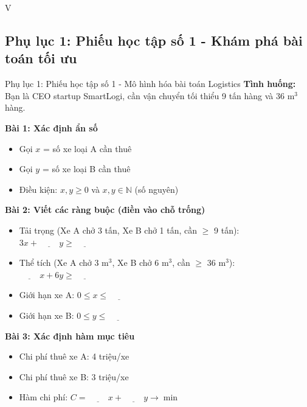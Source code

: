
\begin{competitionsection}{V}
\vspace{0.5cm}
\subsection*{Phụ lục 1: Phiếu học tập số 1 - Khám phá bài toán tối ưu}
\begin{phieuhoc_tap_box}{Phụ lục 1: Phiếu học tập số 1 - Mô hình hóa bài toán Logistics}
\textbf{Tình huống:} Bạn là CEO startup SmartLogi, cần vận chuyển tối thiểu 9 tấn hàng và 36 m$^3$ hàng.

\vspace{0.5cm}
\textbf{Bài 1: Xác định ẩn số}
\begin{itemize}[leftmargin=*,noitemsep]
\item Gọi $x$ = số xe loại A cần thuê
\item Gọi $y$ = số xe loại B cần thuê
\item Điều kiện: $x, y \ge 0$ và $x, y \in \mathbb{N}$ (số nguyên)
\end{itemize}

\textbf{Bài 2: Viết các ràng buộc (điền vào chỗ trống)}
\begin{itemize}[leftmargin=*,noitemsep]
\item Tải trọng (Xe A chở 3 tấn, Xe B chở 1 tấn, cần $\ge$ 9 tấn): $3x + \underline{\hspace{1cm}}y \ge \underline{\hspace{1cm}}$
\item Thể tích (Xe A chở 3 m$^3$, Xe B chở 6 m$^3$, cần $\ge$ 36 m$^3$): $\underline{\hspace{1cm}}x + 6y \ge \underline{\hspace{1cm}}$
\item Giới hạn xe A: $0 \le x \le \underline{\hspace{1cm}}$
\item Giới hạn xe B: $0 \le y \le \underline{\hspace{1cm}}$
\end{itemize}

\textbf{Bài 3: Xác định hàm mục tiêu}
\begin{itemize}[leftmargin=*,noitemsep]
\item Chi phí thuê xe A: 4 triệu/xe
\item Chi phí thuê xe B: 3 triệu/xe
\item Hàm chi phí: $C = \underline{\hspace{1cm}}x + \underline{\hspace{1cm}}y \to \min$
\end{itemize}


\end{phieuhoc_tap_box}
\end{competitionsection}
